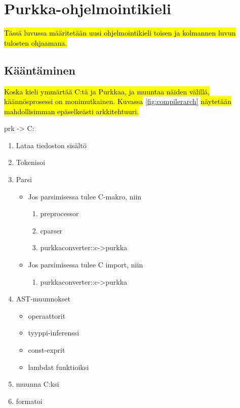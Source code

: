 \section{Purkka-ohjelmointikieli}

\hl{Tässä luvussa määritetään uusi ohjelmointikieli toisen ja kolmannen luvun
tulosten ohjaamana.}

\subsection{Kääntäminen}

\hl{Koska kieli ymmärtää C:tä ja Purkkaa, ja muuntaa näiden välillä,
käännösprosessi on monimutkainen. Kuvassa} \ref{fig:compilerarch} \hl{näytetään
mahdollisimman epäselkeästi arkkitehtuuri.}

prk -> C:
\begin{enumerate}
    \item Lataa tiedoston sisältö
    \item Tokenisoi
    \item Parsi
        \begin{itemize}
            \item Jos parsimisessa tulee C-makro, niin
                \begin{enumerate}
                    \item preprocessor
                    \item cparser
                    \item purkkaconverter::c->purkka
                \end{enumerate}
            \item Jos parsimisessa tulee C import, niin
                \begin{enumerate}
                    \item purkkaconverter::c->purkka
                \end{enumerate}
        \end{itemize}
    \item AST-muunnokset
        \begin{itemize}
            \item operaattorit
            \item tyyppi-inferenssi
            \item const-exprit
            \item lambdat funktioiksi
        \end{itemize}
    \item muunna C:ksi
    \item formatoi
\end{enumerate}

